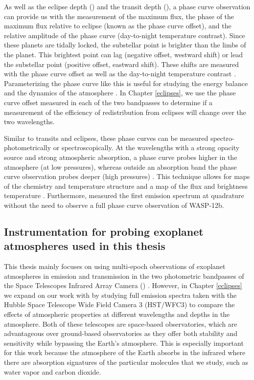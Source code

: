 As well as the eclipse depth (\fpfs) and the transit depth (\rprss), a phase curve observation can provide us with the measurement of the maximum flux, the phase of the maximum flux relative to eclipse (known as the phase curve offset), and the relative amplitude of the phase curve (day-to-night temperature contrast). Since these planets are tidally locked, the substellar point is brighter than the limbs of the planet. This brightest point can lag (negative offset, westward shift) or lead the substellar point (positive offset, eastward shift). These shifts are measured with the phase curve offset as well as the day-to-night temperature contrast \citep{Showman2002}. Parameterizing the phase curve like this is useful for studying the energy balance and the dynamics of the atmosphere \citep{Cowan2012b, Schwartz2015}. In Chapter \ref{eclipses}, we use the phase curve offset measured in each of the two \spitzerIRAC bandpasses to determine if a measurement of the efficiency of redistribution from eclipses will change over the two wavelengths.

Similar to transits and eclipses, these phase curves can be measured spectro-photometrically or spectroscopically. At the wavelengths with a strong opacity source and strong atmospheric absorption, a phase curve probes higher in the atmosphere (at low pressures), whereas outside an absorption band the phase curve observation probes deeper (high pressures) \citep{Showman2009, Kataria2015}. This technique allows for maps of the chemistry and temperature structure and a map of the flux and brightness temperature \citep{Cowan2008, Showman2008, Knutson2009c, Stevenson2017}. Furthermore, \citet{Arcangeli2021} measured the first emission spectrum at quadrature without the need to observe a full phase curve observation of WASP-12b.

\subsection{Instrumentation for probing exoplanet atmospheres used in this thesis} %

This thesis mainly focuses on using multi-epoch observations of exoplanet atmospheres in emission and transmission in the two photometric bandpasses of the \spitzer Space Telescopes Infrared Array Camera (\spitzerIRAC) \citep{Werner2004}. However, in Chapter \ref{eclipses} we expand on our work with \spitzer by studying full emission spectra taken with the Hubble Space Telescope Wide Field Camera 3 (HST/WFC3) to compare the effects of atmospheric properties at different wavelengths and depths in the atmosphere. Both of these telescopes are space-based observatories, which are advantageous over ground-based observatories as they offer both stability and sensitivity while bypassing the Earth's atmosphere. This is especially  important for this work because the atmosphere of the Earth absorbs in the infrared where there are absorption signatures of the particular  molecules that we study, such as water vapor and carbon dioxide.

